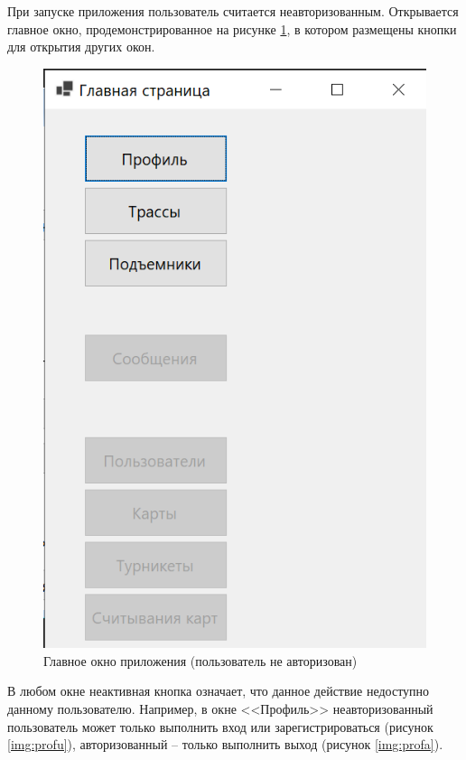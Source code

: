 При запуске приложения пользователь считается неавторизованным. Открывается главное окно, продемонстрированное на рисунке \ref{img:main}, в котором размещены кнопки для открытия других окон. 

\clearpage
\begin{figure}[h!]
	\begin{center}
		\includegraphics[scale=0.8]{../imgs/int/main.png}
	\end{center}
	\captionsetup{justification=centering}
	\caption{Главное окно приложения (пользователь не авторизован)}
	\label{img:main}
\end{figure}

В любом окне неактивная кнопка означает, что данное действие недоступно данному пользователю. Например, в окне <<Профиль>> неавторизованный пользователь может только выполнить вход или зарегистрироваться (рисунок \ref{img:profu}), авторизованный -- только выполнить выход (рисунок \ref{img:profa}).


